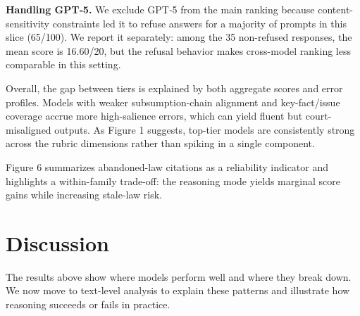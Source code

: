\documentclass[pdflatex,sn-mathphys-ay]{sn-jnl}%
\theoremstyle{thmstyleone}%
\theoremstyle{thmstyletwo}%
\theoremstyle{thmstylethree}%
\begin{document}
\textbf{Handling GPT‑5.} We exclude GPT‑5 from the main ranking because content-sensitivity constraints led it to refuse answers for a majority of prompts in this slice (65/100). We report it separately: among the 35 non-refused responses, the mean score is 16.60/20, but the refusal behavior makes cross-model ranking less comparable in this setting.

Overall, the gap between tiers is explained by both aggregate scores and error profiles. Models with weaker subsumption-chain alignment and key-fact/issue coverage accrue more high-salience errors, which can yield fluent but court-misaligned outputs. As Figure 1 suggests, top-tier models are consistently strong across the rubric dimensions rather than spiking in a single component.

Figure 6 summarizes abandoned-law citations as a reliability indicator and highlights a within-family trade-off: the reasoning mode yields marginal score gains while increasing stale-law risk.

\section{Discussion}\label{sec5}
The results above show where models perform well and where they break down.\\
We now move to text-level analysis to explain these patterns and illustrate how reasoning succeeds or fails in practice.
\end{document}
